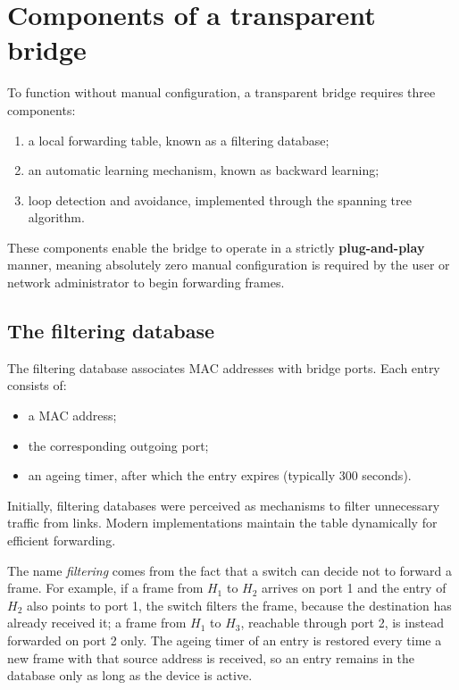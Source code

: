 \section{Components of a transparent bridge}

To function without manual configuration, a transparent bridge requires three components:

\begin{enumerate}
\item a local forwarding table, known as a filtering database;
\item an automatic learning mechanism, known as backward learning;
\item loop detection and avoidance, implemented through the spanning tree algorithm.
\end{enumerate}

These components enable the bridge to operate in a strictly \textbf{plug-and-play} manner, meaning absolutely zero manual configuration is required by the user or network administrator to begin forwarding frames.

\subsection{The filtering database}

The filtering database associates MAC addresses with bridge ports. Each entry consists of:

\begin{itemize}
\item a MAC address;
\item the corresponding outgoing port;
\item an ageing timer, after which the entry expires (typically 300 seconds).
\end{itemize}

Initially, filtering databases were perceived as mechanisms to filter unnecessary traffic from links. Modern implementations maintain the table dynamically for efficient forwarding.

\begin{center}
\end{center}

The name \emph{filtering} comes from the fact that a switch can decide not to forward a frame. For example, if a frame from $H_1$ to $H_2$ arrives on port 1 and the entry of $H_2$ also points to port 1, the switch filters the frame, because the destination has already received it; a frame from $H_1$ to $H_3$, reachable through port 2, is instead forwarded on port 2 only. The ageing timer of an entry is restored every time a new frame with that source address is received, so an entry remains in the database only as long as the device is active.

